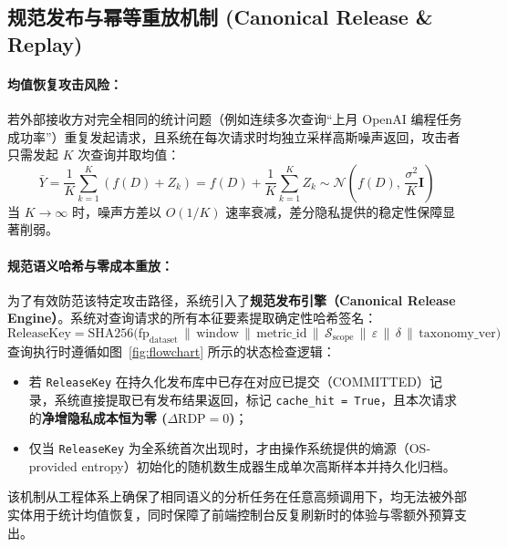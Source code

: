 \subsection{规范发布与幂等重放机制 (Canonical Release \& Replay)}
\paragraph{均值恢复攻击风险：}
若外部接收方对完全相同的统计问题（例如连续多次查询“上月 OpenAI 编程任务成功率”）重复发起请求，且系统在每次请求时均独立采样高斯噪声返回，攻击者只需发起 $K$ 次查询并取均值：
\begin{equation}
  \bar{Y} = \frac{1}{K} \sum_{k=1}^K \left( f(D) + Z_k \right) = f(D) + \frac{1}{K} \sum_{k=1}^K Z_k \sim \mathcal{N}\left(f(D), \, \frac{\sigma^2}{K} \mathbf{I}\right)
\end{equation}
当 $K \to \infty$ 时，噪声方差以 $O(1/K)$ 速率衰减，差分隐私提供的稳定性保障显著削弱。

\paragraph{规范语义哈希与零成本重放：}
为了有效防范该特定攻击路径，系统引入了\textbf{规范发布引擎（Canonical Release Engine）}。系统对查询请求的所有本征要素提取确定性哈希签名：
\begin{equation}
  \text{ReleaseKey} = \text{SHA256}\Big(\text{fp}_{\text{dataset}} \,\|\, \text{window} \,\|\, \text{metric\_id} \,\|\, \mathcal{S}_{\text{scope}} \,\|\, \varepsilon \,\|\, \delta \,\|\, \text{taxonomy\_ver}\Big)
\end{equation}
查询执行时遵循如图~\ref{fig:flowchart} 所示的状态检查逻辑：
\begin{itemize}[leftmargin=2em]
  \item 若 \texttt{ReleaseKey} 在持久化发布库中已存在对应已提交（COMMITTED）记录，系统直接提取已有发布结果返回，标记 \texttt{cache\_hit = True}，且本次请求的\textbf{净增隐私成本恒为零 ($\Delta\text{RDP} = 0$)}；
  \item 仅当 \texttt{ReleaseKey} 为全系统首次出现时，才由操作系统提供的熵源（OS-provided entropy）初始化的随机数生成器生成单次高斯样本并持久化归档。
\end{itemize}
该机制从工程体系上确保了相同语义的分析任务在任意高频调用下，均无法被外部实体用于统计均值恢复，同时保障了前端控制台反复刷新时的体验与零额外预算支出。
